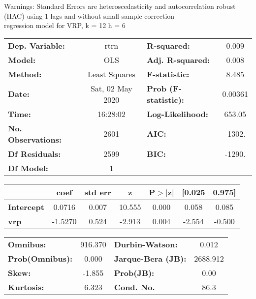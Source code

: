 Warnings: \newline
 [1] Standard Errors are heteroscedasticity and autocorrelation robust (HAC) using 1 lags and without small sample correction\\ 

regression model for VRP, k = 12 h = 6\begin{center}
\begin{tabular}{lclc}
\toprule
\textbf{Dep. Variable:}    &       rtrn       & \textbf{  R-squared:         } &     0.009   \\
\textbf{Model:}            &       OLS        & \textbf{  Adj. R-squared:    } &     0.008   \\
\textbf{Method:}           &  Least Squares   & \textbf{  F-statistic:       } &     8.485   \\
\textbf{Date:}             & Sat, 02 May 2020 & \textbf{  Prob (F-statistic):} &  0.00361    \\
\textbf{Time:}             &     16:28:02     & \textbf{  Log-Likelihood:    } &    653.05   \\
\textbf{No. Observations:} &        2601      & \textbf{  AIC:               } &    -1302.   \\
\textbf{Df Residuals:}     &        2599      & \textbf{  BIC:               } &    -1290.   \\
\textbf{Df Model:}         &           1      & \textbf{                     } &             \\
\bottomrule
\end{tabular}
\begin{tabular}{lcccccc}
                   & \textbf{coef} & \textbf{std err} & \textbf{z} & \textbf{P$> |$z$|$} & \textbf{[0.025} & \textbf{0.975]}  \\
\midrule
\textbf{Intercept} &       0.0716  &        0.007     &    10.555  &         0.000        &        0.058    &        0.085     \\
\textbf{vrp}       &      -1.5270  &        0.524     &    -2.913  &         0.004        &       -2.554    &       -0.500     \\
\bottomrule
\end{tabular}
\begin{tabular}{lclc}
\textbf{Omnibus:}       & 916.370 & \textbf{  Durbin-Watson:     } &    0.012  \\
\textbf{Prob(Omnibus):} &   0.000 & \textbf{  Jarque-Bera (JB):  } & 2688.912  \\
\textbf{Skew:}          &  -1.855 & \textbf{  Prob(JB):          } &     0.00  \\
\textbf{Kurtosis:}      &   6.323 & \textbf{  Cond. No.          } &     86.3  \\
\bottomrule
\end{tabular}
\end{center}

